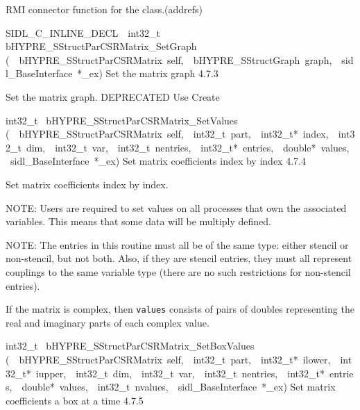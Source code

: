 \documentclass{article}
\begin{document}
\begin{cxxentry}
\begin{cxxentry}
\begin{cxxfunction}
\begin{cxxdoc}
RMI connector function for the class.(addrefs)
\end{cxxdoc}
\end{cxxfunction}
\begin{cxxfunction}
{SIDL\_C\_INLINE\_DECL\ \ int32\_t\ }
        {bHYPRE\_SStructParCSRMatrix\_SetGraph}
        {(\ \ bHYPRE\_SStructParCSRMatrix\ self,\ \ bHYPRE\_SStructGraph\ graph,\ \ sidl\_BaseInterface\ *\_ex)}
        {
Set the matrix graph}
        {4.7.3}
\begin{cxxdoc}

Set the matrix graph.
DEPRECATED     Use Create
\end{cxxdoc}
\end{cxxfunction}
\begin{cxxfunction}
{int32\_t\ }
        {bHYPRE\_SStructParCSRMatrix\_SetValues}
        {(\ \ bHYPRE\_SStructParCSRMatrix\ self,\ \ int32\_t\ part,\ \ int32\_t*\ index,\ \ int32\_t\ dim,\ \ int32\_t\ var,\ \ int32\_t\ nentries,\ \ int32\_t*\ entries,\ \ double*\ values,\ \ sidl\_BaseInterface\ *\_ex)}
        {
Set matrix coefficients index by index}
        {4.7.4}
\begin{cxxdoc}

Set matrix coefficients index by index.

NOTE: Users are required to set values on all processes that
own the associated variables.  This means that some data will
be multiply defined.

NOTE: The entries in this routine must all be of the same
type: either stencil or non-stencil, but not both.  Also, if
they are stencil entries, they must all represent couplings
to the same variable type (there are no such restrictions for
non-stencil entries).

If the matrix is complex, then {\tt values} consists of pairs
of doubles representing the real and imaginary parts of each
complex value.
\end{cxxdoc}
\end{cxxfunction}
\begin{cxxfunction}
{int32\_t\ }
        {bHYPRE\_SStructParCSRMatrix\_SetBoxValues}
        {(\ \ bHYPRE\_SStructParCSRMatrix\ self,\ \ int32\_t\ part,\ \ int32\_t*\ ilower,\ \ int32\_t*\ iupper,\ \ int32\_t\ dim,\ \ int32\_t\ var,\ \ int32\_t\ nentries,\ \ int32\_t*\ entries,\ \ double*\ values,\ \ int32\_t\ nvalues,\ \ sidl\_BaseInterface\ *\_ex)}
        {
Set matrix coefficients a box at a time}
        {4.7.5}
\begin{cxxdoc}


\end{cxxdoc}
\end{cxxfunction}
\end{cxxentry}
\end{cxxentry}
\end{document}
